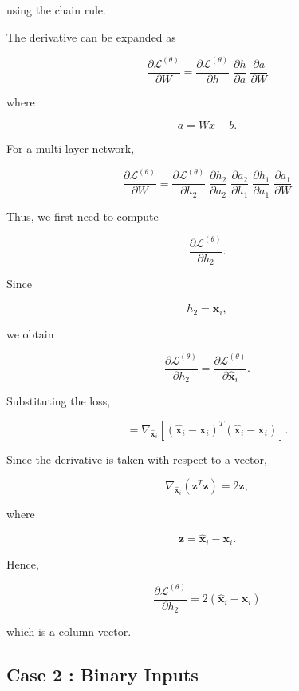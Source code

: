 \documentclass{article}
\begin{document}
	using the chain rule.
	
	
	The derivative can be expanded as
	
	\[
	\boxed{
		\frac{\partial \mathcal{L}^{(\theta)}}{\partial W}
		=
		\frac{\partial \mathcal{L}^{(\theta)}}{\partial h}
		\;
		\frac{\partial h}{\partial a}
		\;
		\frac{\partial a}{\partial W}
	}
	\]
	
	where
	
	\[
	a=Wx+b.
	\]
	
	For a multi-layer network,
	
	\[
	\boxed{
		\frac{\partial \mathcal{L}^{(\theta)}}{\partial W}
		=
		\frac{\partial \mathcal{L}^{(\theta)}}{\partial h_2}
		\;
		\frac{\partial h_2}{\partial a_2}
		\;
		\frac{\partial a_2}{\partial h_1}
		\;
		\frac{\partial h_1}{\partial a_1}
		\;
		\frac{\partial a_1}{\partial W}
	}
	\]
	
	Thus, we first need to compute
	
	\[
	\frac{\partial \mathcal{L}^{(\theta)}}{\partial h_2}.
	\]
	
	
	Since
	
	\[
	h_2=\hat{\mathbf{x}}_i,
	\]
	
	we obtain
	
	\[
	\frac{\partial \mathcal{L}^{(\theta)}}{\partial h_2}
	=
	\frac{\partial \mathcal{L}^{(\theta)}}{\partial \hat{\mathbf{x}}_i}.
	\]
	
	Substituting the loss,
	
	\[
	=
	\nabla_{\hat{\mathbf{x}}_i}
	\left[
	(\hat{\mathbf{x}}_i-\mathbf{x}_i)^T
	(\hat{\mathbf{x}}_i-\mathbf{x}_i)
	\right].
	\]
	
	Since the derivative is taken with respect to a vector,
	
	\[
	\nabla_{\hat{\mathbf{x}}_i}
	(\mathbf{z}^T\mathbf{z})
	=
	2\mathbf{z},
	\]
	
	where
	
	\[
	\mathbf{z}
	=
	\hat{\mathbf{x}}_i-\mathbf{x}_i.
	\]
	
	Hence,
	
	\[
	\boxed{
		\frac{\partial \mathcal{L}^{(\theta)}}{\partial h_2}
		=
		2(\hat{\mathbf{x}}_i-\mathbf{x}_i)
	}
	\]
	
	which is a column vector.
	
	\subsection*{Case 2 : Binary Inputs}
	
\end{document}
